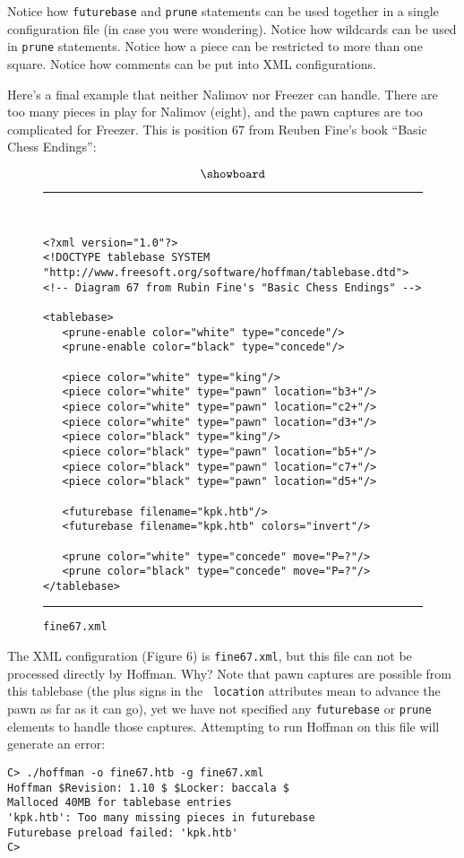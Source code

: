 \documentclass[11pt]{article}
\begin{document}
Notice how {\tt futurebase} and {\tt prune} statements can be used
together in a single configuration file (in case you were wondering).
Notice how wildcards can be used in {\tt prune} statements.  Notice
how a piece can be restricted to more than one square.  Notice how
comments can be put into XML configurations.

Here's a final example that neither Nalimov nor Freezer can handle.
There are too many pieces in play for Nalimov (eight), and the pawn
captures are too complicated for Freezer.  This is position 67 from
Reuben Fine's book ``Basic Chess Endings'':

$$\showboard$$

\begin{figure}
\hrule\ 
{\small\begin{verbatim}
<?xml version="1.0"?>
<!DOCTYPE tablebase SYSTEM "http://www.freesoft.org/software/hoffman/tablebase.dtd">
<!-- Diagram 67 from Rubin Fine's "Basic Chess Endings" -->

<tablebase>
   <prune-enable color="white" type="concede"/>
   <prune-enable color="black" type="concede"/>

   <piece color="white" type="king"/>
   <piece color="white" type="pawn" location="b3+"/>
   <piece color="white" type="pawn" location="c2+"/>
   <piece color="white" type="pawn" location="d3+"/>
   <piece color="black" type="king"/>
   <piece color="black" type="pawn" location="b5+"/>
   <piece color="black" type="pawn" location="c7+"/>
   <piece color="black" type="pawn" location="d5+"/>

   <futurebase filename="kpk.htb"/>
   <futurebase filename="kpk.htb" colors="invert"/>

   <prune color="white" type="concede" move="P=?"/>
   <prune color="black" type="concede" move="P=?"/>
</tablebase>
\end{verbatim}}
\hrule
\caption{\tt fine67.xml}
\end{figure}

The XML configuration (Figure 6) is {\tt fine67.xml}, but this file
can not be processed directly by Hoffman.  Why?  Note that pawn
captures are possible from this tablebase (the plus signs in the {\tt
location} attributes mean to advance the pawn as far as it can go),
yet we have not specified any {\tt futurebase} or {\tt prune} elements
to handle those captures.  Attempting to run Hoffman on this file will
generate an error:

\begin{verbatim}
C> ./hoffman -o fine67.htb -g fine67.xml
Hoffman $Revision: 1.10 $ $Locker: baccala $
Malloced 40MB for tablebase entries
'kpk.htb': Too many missing pieces in futurebase
Futurebase preload failed: 'kpk.htb'
C>
\end{verbatim}
\end{document}
